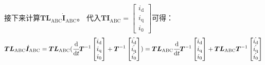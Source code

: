 接下来计算\(\bm{T}\bm{L}_{\mathrm{ABC}}\dot{\bm{I}}_{\mathrm{ABC}}\)。
代入\(\bm{T}\bm{I}_{\mathrm{ABC}}=\begin{bmatrix}i_{\mathrm{d}}\\i_{\mathrm{q}}\\i_{\mathrm{0}}\end{bmatrix}\)可得：
\begin{equation*}
\bm{T}\bm{L}_{\mathrm{ABC}}\dot{\bm{I}}_{\mathrm{ABC}}
=\bm{T}\bm{L}_{\mathrm{ABC}}(\cfrac{\mathrm{d}}{\mathrm{d} t}\bm{T}^{-1}
\begin{bmatrix}i_{\mathrm{d}}\\i_{\mathrm{q}}\\i_{\mathrm{0}}\end{bmatrix}
+\bm{T}^{-1}\begin{bmatrix}\dot{i_{\mathrm{d}}}\\\dot{i_{\mathrm{q}}}\\\dot{i_{\mathrm{0}}}\end{bmatrix})
=\bm{T}\bm{L}_{\mathrm{ABC}}\cfrac{\mathrm{d}}{\mathrm{d} t}\bm{T}^{-1}
\begin{bmatrix}i_{\mathrm{d}}\\i_{\mathrm{q}}\\i_{\mathrm{0}}\end{bmatrix}
+\bm{T}\bm{L}_{\mathrm{ABC}}\bm{T}^{-1}
\begin{bmatrix}\dot{i_{\mathrm{d}}}\\\dot{i_{\mathrm{q}}}\\\dot{i_{\mathrm{0}}}\end{bmatrix}
\end{equation*}

